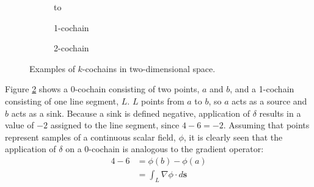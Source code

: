 \begin{figure}[ht]
\begin{subfigure}[c]{0.3\textwidth}
        \label{fig:0cochainExample}
    \end{subfigure}
    \begin{subfigure}[c]{0.3\textwidth}
        \centering
        \vbox to \ht{}
        \caption{1-cochain}
        \label{fig:1cochainExample}
    \end{subfigure}
    \begin{subfigure}[c]{0.3\textwidth}
        \centering
        \usebox{\boxExample}
        \caption{2-cochain}
        \label{fig:2cochainExample}
    \end{subfigure}
    \caption{Examples of $k$-cochains in two-dimensional space.}
    \label{fig:cochainExamples}
\end{figure}

Figure \ref{fig:1cochainExample} shows a 0-cochain consisting of two points, $a$ and $b$, and a 1-cochain consisting of one line segment, $L$. $L$ points from $a$ to $b$, so $a$ acts as a source and $b$ acts as a sink. Because a sink is defined negative, application of $\delta$ results in a value of $-2$ assigned to the line segment, since $4 - 6 = -2$. Assuming that points represent samples of a continuous scalar field, $\phi$, it is clearly seen that the application of $\delta$ on a 0-cochain is analogous to the gradient operator:
\begin{equation}
    \begin{split}
        4 - 6 &= \phi(b) - \phi(a) \\
        &= \int_{L} \nabla \phi \cdot d\mathbf{s}
    \end{split}
\end{equation}

